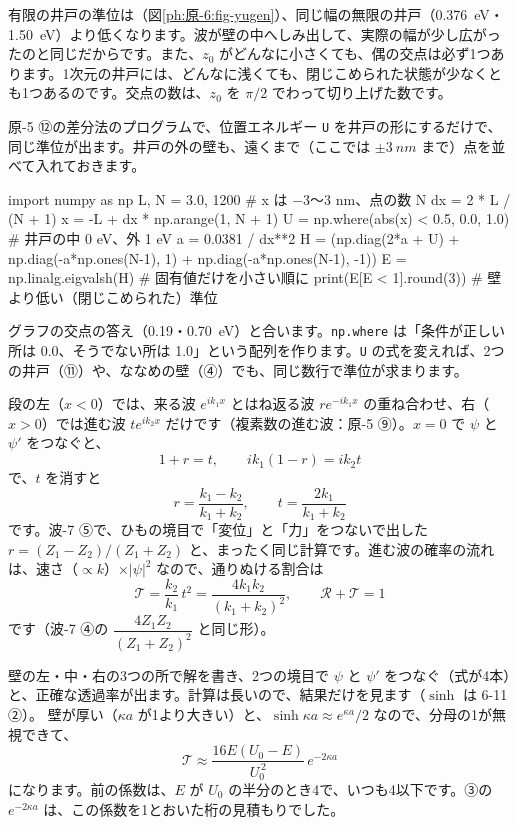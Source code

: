 \noindent 有限の井戸の準位は（図\ref{ph:原-6:fig-yugen}）、同じ幅の無限の井戸（\qty{0.376}{eV}・\qty{1.50}{eV}）より低くなります。波が壁の中へしみ出して、実際の幅が少し広がったのと同じだからです。また、$z_0$ がどんなに小さくても、偶の交点は必ず1つあります。1次元の井戸には、どんなに浅くても、閉じこめられた状態が少なくとも1つあるのです。交点の数は、$z_0$ を $\pi/2$ でわって切り上げた数です。

原-5 ⑫の差分法のプログラムで、位置エネルギー \texttt{U} を井戸の形にするだけで、同じ準位が出ます。井戸の外の壁も、遠くまで（ここでは $\pm\qty{3}{nm}$ まで）点を並べて入れておきます。
\begin{phcode}[Python]
import numpy as np
L, N = 3.0, 1200                  \# x は −3〜3 nm、点の数 N
dx = 2 * L / (N + 1)
x = -L + dx * np.arange(1, N + 1)
U = np.where(abs(x) < 0.5, 0.0, 1.0)   \# 井戸の中 0 eV、外 1 eV
a = 0.0381 / dx**2
H = (np.diag(2*a + U) + np.diag(-a*np.ones(N-1), 1)
     + np.diag(-a*np.ones(N-1), -1))
E = np.linalg.eigvalsh(H)         \# 固有値だけを小さい順に
print(E[E < 1].round(3))          \# 壁より低い（閉じこめられた）準位
\end{phcode}
\begin{phcodeout}[実行結果]
[0.191 0.703]
\end{phcodeout}
グラフの交点の答え（0.19・\qty{0.70}{eV}）と合います。\texttt{np.where} は「条件が正しい所は 0.0、そうでない所は 1.0」という配列を作ります。\texttt{U} の式を変えれば、2つの井戸（⑪）や、ななめの壁（④）でも、同じ数行で準位が求まります。

\label{ph:原-6:sec7}
段の左（$x<0$）では、来る波 $e^{ik_1x}$ とはね返る波 $re^{-ik_1x}$ の重ね合わせ、右（$x>0$）では進む波 $te^{ik_2x}$ だけです（複素数の進む波：原-5 ⑨）。$x=0$ で $\psi$ と $\psi'$ をつなぐと、
\[1+r=t,\qquad ik_1(1-r)=ik_2t\]
で、$t$ を消すと
\[r=\frac{k_1-k_2}{k_1+k_2},\qquad t=\frac{2k_1}{k_1+k_2}\]
です。波-7 ⑤で、ひもの境目で「変位」と「力」をつないで出した $r=(Z_1-Z_2)/(Z_1+Z_2)$ と、まったく同じ計算です。進む波の確率の流れは、速さ（$\propto k$）×$|\psi|^2$ なので、通りぬける割合は
\[\mathcal T=\frac{k_2}{k_1}\,t^2=\frac{4k_1k_2}{(k_1+k_2)^2},\qquad \mathcal R+\mathcal T=1\]
です（波-7 ④の $\dfrac{4Z_1Z_2}{(Z_1+Z_2)^2}$ と同じ形）。

壁の左・中・右の3つの所で解を書き、2つの境目で $\psi$ と $\psi'$ をつなぐ（式が4本）と、正確な透過率が出ます。計算は長いので、結果だけを見ます（$\sinh$ は 6-11 ②）。
\label{ph:原-6:seikaku}壁が厚い（$\kappa a$ が1より大きい）と、$\sinh\kappa a\approx e^{\kappa a}/2$ なので、分母の1が無視できて、
\[\mathcal T\approx\frac{16E(U_0-E)}{U_0^{\,2}}\,e^{-2\kappa a}\]
になります。前の係数は、$E$ が $U_0$ の半分のとき4で、いつも4以下です。③の $e^{-2\kappa a}$ は、この係数を1とおいた桁の見積もりでした。

